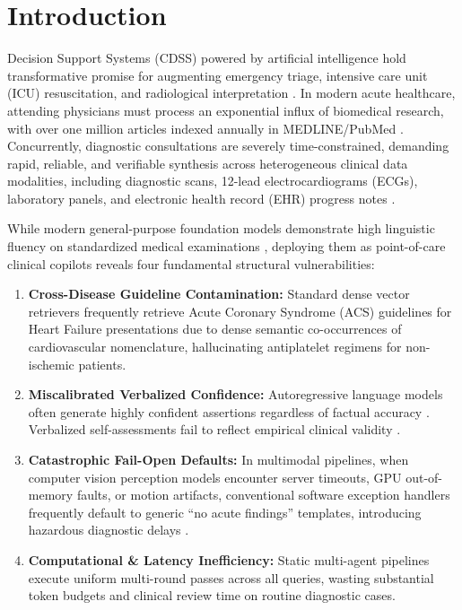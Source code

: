 \documentclass[journal,10pt,twocolumn]{IEEEtran}
\begin{document}
\section{Introduction}
 Decision Support Systems (CDSS) powered by artificial intelligence hold transformative promise for augmenting emergency triage, intensive care unit (ICU) resuscitation, and radiological interpretation \cite{singhal2023medpalm,tu2024medpalmm,topol2019high}. In modern acute healthcare, attending physicians must process an exponential influx of biomedical research, with over one million articles indexed annually in MEDLINE/PubMed \cite{sayers2021pubmed,jin2019pubmedqa,jin2021medqa}. Concurrently, diagnostic consultations are severely time-constrained, demanding rapid, reliable, and verifiable synthesis across heterogeneous clinical data modalities, including diagnostic scans, 12-lead electrocardiograms (ECGs), laboratory panels, and electronic health record (EHR) progress notes \cite{rajpurkar2022ai,kelly2019key}.

While modern general-purpose foundation models demonstrate high linguistic fluency on standardized medical examinations \cite{pal2022medmcqa}, deploying them as point-of-care clinical copilots reveals four fundamental structural vulnerabilities:
\begin{enumerate}
    \item \textbf{Cross-Disease Guideline Contamination:} Standard dense vector retrievers \cite{karpukhin2020dense,lewis2020rag} frequently retrieve Acute Coronary Syndrome (ACS) guidelines for Heart Failure presentations due to dense semantic co-occurrences of cardiovascular nomenclature, hallucinating antiplatelet regimens for non-ischemic patients.
    \item \textbf{Miscalibrated Verbalized Confidence:} Autoregressive language models often generate highly confident assertions regardless of factual accuracy \cite{guo2017calibration,kadavath2022language}. Verbalized self-assessments fail to reflect empirical clinical validity \cite{xiong2024can}.
    \item \textbf{Catastrophic Fail-Open Defaults:} In multimodal pipelines, when computer vision perception models encounter server timeouts, GPU out-of-memory faults, or motion artifacts, conventional software exception handlers frequently default to generic ``no acute findings'' templates, introducing hazardous diagnostic delays \cite{ji2023survey,azamfirei2023large}.
    \item \textbf{Computational \& Latency Inefficiency:} Static multi-agent pipelines \cite{wu2023autogen,hong2024metagpt,du2024improving} execute uniform multi-round passes across all queries, wasting substantial token budgets and clinical review time on routine diagnostic cases.
\end{enumerate}
\end{document}
